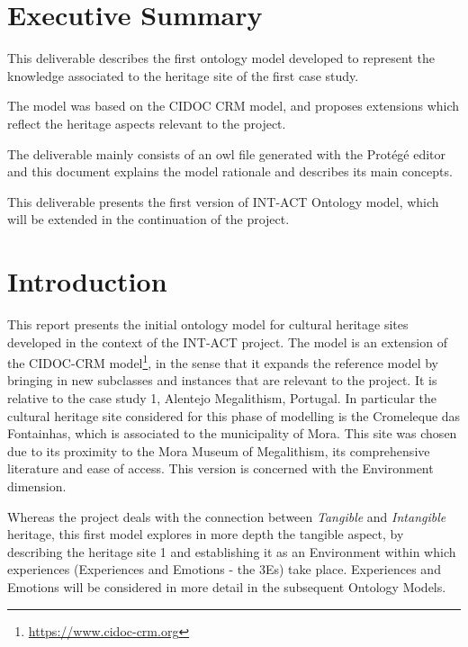 \documentclass[10pt]{report}
\begin{document}
\newpage
\section {Executive Summary} 

This deliverable describes the first ontology  model developed to represent the knowledge associated to the heritage site of the first case study.

The model was based on the CIDOC CRM model, and proposes extensions which reflect the heritage aspects relevant to the project.

The deliverable mainly consists of an owl file generated with the Protégé editor and this document explains the model rationale and describes its main concepts.

This deliverable presents the first version of INT-ACT Ontology model, which will be extended in the continuation of the project. 





















\newpage
\section{Introduction}

This report presents the initial ontology model for cultural heritage sites developed in the context of the INT-ACT project. The model is an extension of the CIDOC-CRM model\footnote{\url{https://www.cidoc-crm.org}}, in the sense that it expands the reference model by bringing in new subclasses and instances that are relevant to the project. It is relative to the case study 1,  Alentejo Megalithism, Portugal.   In particular the cultural heritage site considered for this phase of modelling is the Cromeleque das Fontainhas, which is associated to the municipality of Mora. This site was chosen due to its proximity to the Mora Museum of Megalithism, its comprehensive literature and ease of access. This version is concerned with the Environment dimension.

Whereas the project deals with the connection between \textit{Tangible} and \textit{Intangible} heritage, this first model explores in more depth the tangible aspect, by describing the heritage site 1  and establishing it as an Environment within which experiences (Experiences and Emotions - the 3Es) take place. Experiences and Emotions will be considered in more detail in the subsequent Ontology Models.
\end{document}
